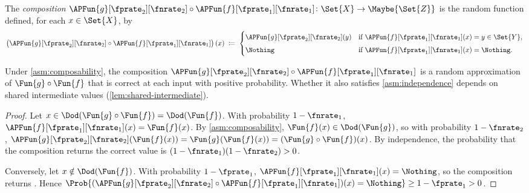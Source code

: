 \documentclass[ ../main.tex]{subfiles}
\begin{document}
\begin{definition}
\label{def:approx-comp}
The \emph{composition}
$\APFun{g}[\fprate_2][\fnrate_2] \circ
 \APFun{f}[\fprate_1][\fnrate_1]
 \colon \Set{X} \to \Maybe{\Set{Z}}$
is the random function defined, for each $x \in \Set{X}$, by
\begin{equation}
\label{eq:comp-def}
\left(\APFun{g}[\fprate_2][\fnrate_2] \circ
      \APFun{f}[\fprate_1][\fnrate_1]\right)(x)
\;\coloneqq\;
\begin{cases}
\APFun{g}[\fprate_2][\fnrate_2](y)
  & \text{if } \APFun{f}[\fprate_1][\fnrate_1](x) = y \in \Set{Y},\\[4pt]
\Nothing
  & \text{if } \APFun{f}[\fprate_1][\fnrate_1](x) = \Nothing.
\end{cases}
\end{equation}
\end{definition}

\begin{lemma}
\label{prop:closure}
Under \cref{asm:composability}, the composition
$\APFun{g}[\fprate_2][\fnrate_2] \circ
 \APFun{f}[\fprate_1][\fnrate_1]$
is a random approximation of $\Fun{g} \circ \Fun{f}$ that is correct
at each input with positive probability.  Whether it also satisfies
\cref{asm:independence} depends on shared intermediate values
(\cref{lem:shared-intermediate}).
\end{lemma}
\begin{proof}
Let $x \in \Dod(\Fun{g} \circ \Fun{f}) = \Dod(\Fun{f})$.
With probability $1 - \fnrate_1$,
$\APFun{f}[\fprate_1][\fnrate_1](x) = \Fun{f}(x)$.
By \cref{asm:composability},
$\Fun{f}(x) \in \Dod(\Fun{g})$, so with probability
$1 - \fnrate_2$,
$\APFun{g}[\fprate_2][\fnrate_2](\Fun{f}(x)) = \Fun{g}(\Fun{f}(x))
= (\Fun{g} \circ \Fun{f})(x)$.
By independence, the probability that the composition returns the
correct value is $(1 - \fnrate_1)(1 - \fnrate_2) > 0$.

Conversely, let $x \notin \Dod(\Fun{f})$.
With probability $1 - \fprate_1$,
$\APFun{f}[\fprate_1][\fnrate_1](x) = \Nothing$, so the composition
returns \Nothing.
Hence $\Prob{(\APFun{g}[\fprate_2][\fnrate_2] \circ
\APFun{f}[\fprate_1][\fnrate_1])(x) = \Nothing}
\geq 1 - \fprate_1 > 0$.
\end{proof}
\end{document}
